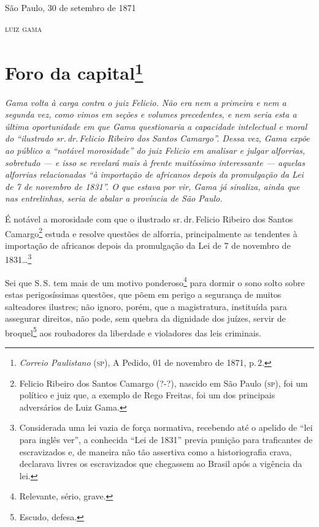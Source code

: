 \begin{flushright}
São Paulo, 30 de setembro de 1871

\textsc{luiz gama}
\end{flushright}

\chapter{Foro da capital\footnote{\emph{Correio Paulistano} (\textsc{sp}), A Pedido, 01 de novembro de 1871,
  p.\,2.}} %

\begin{didascalia}
\emph{Gama volta à carga contra o juiz Felicio. Não era nem a primeira e
nem a segunda vez, como vimos em seções e volumes precedentes, e nem
seria esta a última oportunidade em que Gama questionaria a capacidade
intelectual e moral do ``ilustrado sr.\,dr.\,Felicio Ribeiro dos Santos
Camargo''. Dessa vez, Gama expõe ao público a ``notável morosidade'' do
juiz Felicio em analisar e julgar alforrias, sobretudo --- e isso se
revelará mais à frente muitíssimo interessante --- aquelas alforrias
relacionadas ``à importação de africanos depois da promulgação da Lei de
7 de novembro de 1831''. O que estava por vir, Gama já sinaliza, ainda
que nas entrelinhas, seria de abalar a província de São Paulo.}
\end{didascalia}

É notável a morosidade com que o ilustrado sr.\,dr.\,Felicio Ribeiro dos
Santos Camargo\footnote{ Felicio Ribeiro dos Santos Camargo (?-?),
  nascido em São Paulo (\textsc{sp}), foi um político e juiz que, a exemplo de
  Rego Freitas, foi um dos principais adversários de Luiz Gama.} estuda
e resolve questões de alforria, principalmente as tendentes à importação
de africanos depois da promulgação da Lei de 7 de novembro de
1831\ldots{}\footnote{ Considerada uma lei vazia de força normativa,
  recebendo até o apelido de ``lei para inglês ver'', a conhecida ``Lei de
  1831'' previa punição para traficantes de escravizados e, de maneira
  não tão assertiva como a historiografia crava, declarava livres os
  escravizados que chegassem ao Brasil após a vigência da lei.}

Sei que S.\,S. tem mais de um motivo ponderoso\footnote{ Relevante,
  sério, grave.} para dormir o sono solto sobre estas perigosíssimas
questões, que põem em perigo a segurança de muitos salteadores ilustres;
não ignoro, porém, que a magistratura, instituída para assegurar
direitos, não pode, sem quebra da dignidade dos juízes, servir de
broquel\footnote{ Escudo, defesa.} aos roubadores da liberdade e
violadores das leis criminais.

